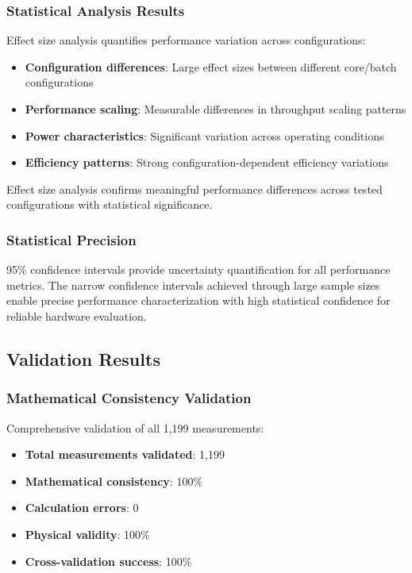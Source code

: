 \documentclass[manuscript]{acmart}
\begin{document}
\subsubsection{Statistical Analysis Results}
Effect size analysis quantifies performance variation across configurations:

\begin{itemize}
    \item \textbf{Configuration differences}: Large effect sizes between different core/batch configurations
    \item \textbf{Performance scaling}: Measurable differences in throughput scaling patterns
    \item \textbf{Power characteristics}: Significant variation across operating conditions
    \item \textbf{Efficiency patterns}: Strong configuration-dependent efficiency variations
\end{itemize}

Effect size analysis confirms meaningful performance differences across tested configurations with statistical significance.

\subsubsection{Statistical Precision}
95\% confidence intervals provide uncertainty quantification for all performance metrics. The narrow confidence intervals achieved through large sample sizes enable precise performance characterization with high statistical confidence for reliable hardware evaluation.

\subsection{Validation Results}

\subsubsection{Mathematical Consistency Validation}
Comprehensive validation of all 1,199 measurements:

\begin{itemize}
    \item \textbf{Total measurements validated}: 1,199
    \item \textbf{Mathematical consistency}: 100\%
    \item \textbf{Calculation errors}: 0
    \item \textbf{Physical validity}: 100\%
    \item \textbf{Cross-validation success}: 100\%
\end{itemize}
\end{document}
